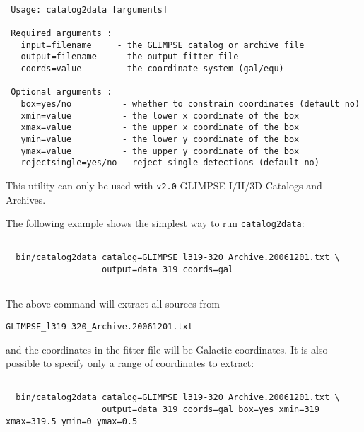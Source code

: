 \documentclass[letterpaper,11pt]{report}
\begin{document}
\begin{Verbatim}[frame=single,label=Syntax]

 Usage: catalog2data [arguments]
 
 Required arguments :
   input=filename     - the GLIMPSE catalog or archive file
   output=filename    - the output fitter file
   coords=value       - the coordinate system (gal/equ)
 
 Optional arguments :
   box=yes/no          - whether to constrain coordinates (default no)
   xmin=value          - the lower x coordinate of the box
   xmax=value          - the upper x coordinate of the box
   ymin=value          - the lower y coordinate of the box
   ymax=value          - the upper y coordinate of the box
   rejectsingle=yes/no - reject single detections (default no)

\end{Verbatim}

\begin{center}
{\color{red}This utility can only be used with \texttt{v2.0} GLIMPSE I/II/3D Catalogs and Archives.}\\
\end{center}

The following example shows the simplest way to run \texttt{catalog2data}:\\

\begin{Verbatim}[frame=single,fontsize=\scriptsize,label=Example 1 - simple extraction]
  
  bin/catalog2data catalog=GLIMPSE_l319-320_Archive.20061201.txt \
                   output=data_319 coords=gal
                             
\end{Verbatim}

The above command will extract all sources from

\begin{Verbatim}
GLIMPSE_l319-320_Archive.20061201.txt
\end{Verbatim}

and the coordinates in the fitter file will be Galactic coordinates. It is also possible to specify only a range of coordinates to extract:\\

\begin{Verbatim}[frame=single,fontsize=\scriptsize,label=Example 2 - simple extraction with constraints on coordinates]
  
  bin/catalog2data catalog=GLIMPSE_l319-320_Archive.20061201.txt \
                   output=data_319 coords=gal box=yes xmin=319 xmax=319.5 ymin=0 ymax=0.5
                             
\end{Verbatim}
\end{document}
